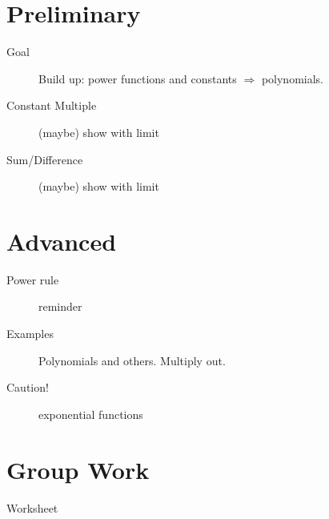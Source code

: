 \documentclass[11pt]{article}
\begin{document}
\drawtitle

\section*{Preliminary}
\begin{description}
\item[Goal] Build up: power functions and constants $\Rightarrow$
  polynomials.
\item[Constant Multiple] (maybe) show with limit
\item[Sum/Difference] (maybe) show with limit
\end{description}

\section*{Advanced}
\begin{description}
\item[Power rule] reminder
\item[Examples] Polynomials and others.  Multiply out.
\item[Caution!] exponential functions
\end{description}

\section*{Group Work}
\begin{description}
\item[Worksheet]
\end{description}
\end{document}
